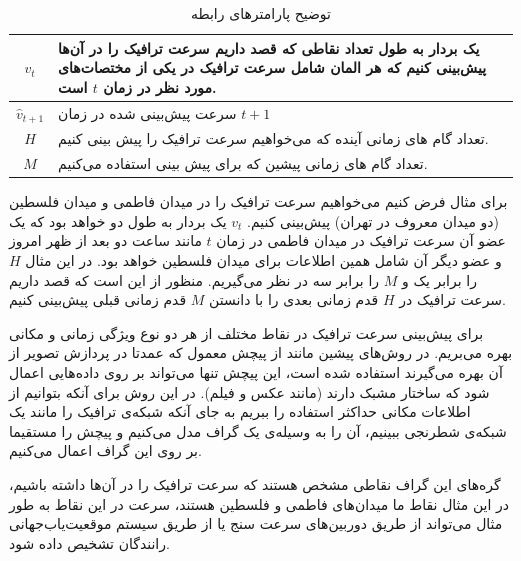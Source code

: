 \documentclass{article}
\begin{document}
\begin{table}[h]
  \centering
  \caption{توضیح پارامترهای رابطه }
  \begin{tabular}{|c|p{}|}
    \hline
    $v_{t}$ & یک بردار به طول تعداد نقاطی که قصد داریم سرعت ترافیک را در آن‌ها پیش‌بینی کنیم که هر المان شامل سرعت ترافیک در یکی از مختصات‌های مورد نظر در زمان $t$ است. \\
    \hline
    $\hat{v}_{t+1}$ & سرعت پیش‌بینی شده در زمان $t+1$ \\
    \hline
    $H$ & تعداد گام های زمانی آینده که می‌خواهیم سرعت ترافیک را پیش بینی کنیم. \\
    \hline
    $M$ & تعداد گام های زمانی پیشین که برای پیش بینی استفاده می‌کنیم. \\
    \hline
  \end{tabular}
  \label{tbl:base}
\end{table}

برای مثال فرض کنیم می‌خواهیم سرعت ترافیک را در میدان فاطمی و میدان فلسطین (دو میدان معروف در تهران) پیش‌بینی کنیم.
$v_{t}$ یک بردار به طول دو خواهد بود که یک عضو آن سرعت ترافیک در میدان فاطمی در زمان $t$ مانند ساعت دو بعد از ظهر امروز و عضو دیگر آن شامل همین اطلاعات برای میدان فلسطین خواهد بود.
در این مثال $H$ را برابر یک و $M$ را برابر سه در نظر می‌گیریم. منظور از  این است که قصد داریم سرعت ترافیک در $H$ قدم زمانی بعدی را با دانستن $M$ قدم زمانی قبلی پیش‌بینی کنیم.

برای پیش‌بینی سرعت ترافیک در نقاط مختلف از هر دو نوع ویژگی زمانی و مکانی بهره می‌بریم.
در روش‌های پیشین مانند  از پیچش معمول که عمدتا در پردازش تصویر از آن بهره می‌گیرند استفاده شده است، این پیچش تنها می‌تواند بر روی داده‌هایی اعمال شود که ساختار مشبک دارند (مانند عکس و فیلم).
در این روش برای آنکه بتوانیم از اطلاعات مکانی حداکثر استفاده را ببریم به جای آنکه شبکه‌ی ترافیک را مانند یک شبکه‌‌ی شطرنجی ببینیم،
آن را به وسیله‌ی یک گراف مدل می‌کنیم و پیچش را مستقیما بر روی این گراف اعمال می‌کنیم.

گره‌های این گراف نقاطی مشخص هستند که سرعت ترافیک را در آن‌ها داشته باشیم، در این مثال نقاط ما میدان‌های فاطمی و فلسطین هستند،
سرعت در این نقاط به طور مثال می‌تواند از طریق دوربین‌های سرعت سنج یا از طریق سیستم موقعیت‌‌یاب‌جهانی رانندگان تشخیص داده شود.
\end{document}

